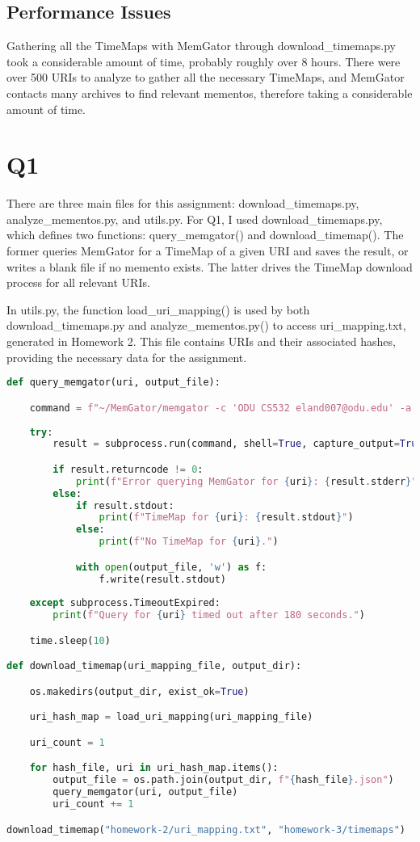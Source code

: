 \documentclass[12pt]{article}
\begin{document}
\subsection*{Performance Issues}
Gathering all the TimeMaps with MemGator through download\_timemaps.py took a considerable amount of time, probably roughly over 8 hours. There were over 500 URIs to analyze to gather all the necessary TimeMaps, and MemGator contacts many archives to find relevant mementos, therefore taking a considerable amount of time.

\section*{Q1}
There are three main files for this assignment: download\_timemaps.py, analyze\_mementos.py, and utils.py. For Q1, I used download\_timemaps.py, which defines two functions: query\_memgator() and download\_timemap(). The former queries MemGator for a TimeMap of a given URI and saves the result, or writes a blank file if no memento exists. The latter drives the TimeMap download process for all relevant URIs.

In utils.py, the function load\_uri\_mapping() is used by both download\_timemaps.py and analyze\_mementos.py() to access uri\_mapping.txt, generated in Homework 2. This file contains URIs and their associated hashes, providing the necessary data for the assignment.

\begin{lstlisting}[language=Python, caption=download\_timemaps.py, label=lst:download_timemaps]
def query_memgator(uri, output_file):

    command = f"~/MemGator/memgator -c 'ODU CS532 eland007@odu.edu' -a ~/MemGator/docs/archives.json -f JSON {uri}"
    
    try:
        result = subprocess.run(command, shell=True, capture_output=True, text=True, timeout=180)

        if result.returncode != 0:
            print(f"Error querying MemGator for {uri}: {result.stderr}")
        else:
            if result.stdout:
                print(f"TimeMap for {uri}: {result.stdout}")
            else:
                print(f"No TimeMap for {uri}.")

            with open(output_file, 'w') as f:
                f.write(result.stdout)
    
    except subprocess.TimeoutExpired:
        print(f"Query for {uri} timed out after 180 seconds.")

    time.sleep(10)

def download_timemap(uri_mapping_file, output_dir):

    os.makedirs(output_dir, exist_ok=True)

    uri_hash_map = load_uri_mapping(uri_mapping_file)

    uri_count = 1

    for hash_file, uri in uri_hash_map.items():
        output_file = os.path.join(output_dir, f"{hash_file}.json")
        query_memgator(uri, output_file)
        uri_count += 1

download_timemap("homework-2/uri_mapping.txt", "homework-3/timemaps")
\end{lstlisting}
\end{document}
